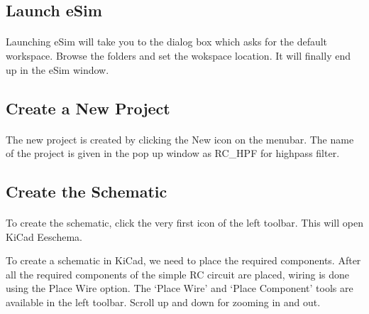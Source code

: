 \subsection{Launch eSim}

\paragraph{}
 Launching eSim will take you to the dialog box which asks for the default workspace. Browse the folders and set the wokspace location. It will finally end up in the eSim window.%

\subsection{Create a New Project}

\paragraph{ } The new project is created by clicking the New icon on the
menubar. The name of the project is given in the pop up window as RC\_HPF for highpass filter.
\subsection{Create the Schematic}

\paragraph{}  To create the schematic, click the very first icon of the
left toolbar. This will open KiCad Eeschema.


To create a schematic in KiCad, we need to place the required components. After all the required components of the simple RC circuit are placed, wiring is
done using the Place Wire option. The `Place Wire' and `Place Component' tools are available in the left toolbar. Scroll up and down for zooming in and out.




